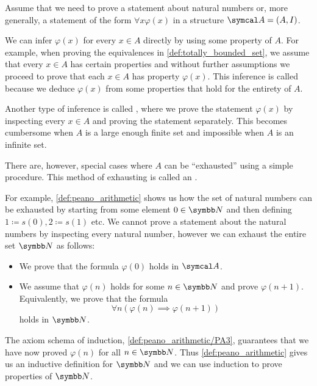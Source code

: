 \begin{remark}\label{remark:induction}
  Assume that we need to prove a statement about natural numbers or, more generally, a statement of the form \( \forall x \varphi(x) \) in a structure \( \Cal{A} = (A, I) \).

  We can infer \( \varphi(x) \) for every \( x \in A \) directly by using some property of \( A \). For example, when proving the equivalences in \cref{def:totally_bounded_set}, we assume that every \( x \in A \) has certain properties and without further assumptions we proceed to prove that each \( x \in A \) has property \( \varphi(x) \). This inference is called  because we deduce \( \varphi(x) \) from some properties that hold for the entirety of \( A \).

  Another type of inference is called , where we prove the statement \( \varphi(x) \) by inspecting every \( x \in A \) and proving the statement separately. This becomes cumbersome when \( A \) is a large enough finite set and impossible when \( A \) is an infinite set.

  There are, however, special cases where \( A \) can be \enquote{exhausted} using a simple procedure. This method of exhausting is called an .

  For example, \cref{def:peano_arithmetic} shows us how the set of natural numbers can be exhausted by starting from some element \( 0 \in \N \) and then defining \( 1 \coloneqq s(0), 2 \coloneqq s(1) \) etc. We cannot prove a statement about the natural numbers by inspecting every natural number, however we can exhaust the entire set \( \N \) as follows:
  \begin{itemize}
    \item We prove that the formula \( \varphi(0) \) holds in \( \Cal{A} \).
    \item We assume that \( \varphi(n) \) holds for some \( n \in \N \) and prove \( \varphi(n + 1) \). Equivalently, we prove that the formula
    \begin{equation*}
      \forall n (\varphi(n) \implies \varphi(n + 1))
    \end{equation*}
    holds in \( \N \).
  \end{itemize}

  The axiom schema of induction, \cref{def:peano_arithmetic/PA3}, guarantees that we have now proved \( \varphi(n) \) for all \( n \in \N \). Thus \cref{def:peano_arithmetic} gives us an inductive definition for \( \N \) and we can use induction to prove properties of \( \N \).


\end{remark}
